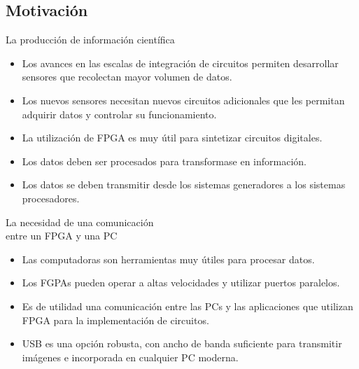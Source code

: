 \documentclass[11pt,a4paper]{beamer}
\begin{document}
		\subsection{Motivación}
			\begin{frame}{La producción de información científica}
				\begin{itemize}
					\item Los avances en las escalas de integración de circuitos permiten desarrollar sensores que recolectan mayor volumen de datos.
					\item Los nuevos sensores necesitan nuevos circuitos adicionales que les permitan adquirir datos y controlar su funcionamiento.
					\item La utilización de FPGA es muy útil para sintetizar circuitos digitales.
					\item Los datos deben ser procesados para transformase en información.
					\item Los datos se deben transmitir desde los sistemas generadores a los sistemas procesadores.
				\end{itemize}
			\end{frame}
			\begin{frame}{La necesidad de una comunicación\\entre un FPGA y una PC}
				\begin{itemize}
					\item Las computadoras son herramientas muy útiles para procesar datos.
					\item Los FGPAs pueden operar a altas velocidades y utilizar puertos paralelos.
					\item Es de utilidad una comunicación entre las PCs y las aplicaciones que utilizan FPGA para la implementación de circuitos.
					\item USB es una opción robusta, con ancho de banda suficiente para transmitir imágenes e incorporada en cualquier PC moderna.
				\end{itemize}
			\end{frame}
\end{document}
